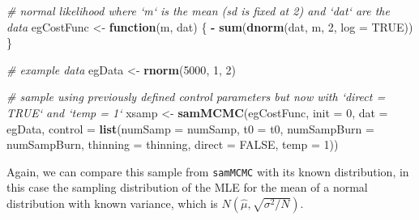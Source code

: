 \documentclass[]{article}
\newenvironment{Shaded}{\begin{snugshade}}{\end{snugshade}}
\newcommand{\CommentTok}[1]{\textcolor[rgb]{0.56,0.35,0.01}{\textit{#1}}}
\newcommand{\ControlFlowTok}[1]{\textcolor[rgb]{0.13,0.29,0.53}{\textbf{#1}}}
\newcommand{\DataTypeTok}[1]{\textcolor[rgb]{0.13,0.29,0.53}{#1}}
\newcommand{\DecValTok}[1]{\textcolor[rgb]{0.00,0.00,0.81}{#1}}
\newcommand{\KeywordTok}[1]{\textcolor[rgb]{0.13,0.29,0.53}{\textbf{#1}}}
\newcommand{\NormalTok}[1]{#1}
\newcommand{\OperatorTok}[1]{\textcolor[rgb]{0.81,0.36,0.00}{\textbf{#1}}}
\newcommand{\OtherTok}[1]{\textcolor[rgb]{0.56,0.35,0.01}{#1}}
\newcommand{\StringTok}[1]{\textcolor[rgb]{0.31,0.60,0.02}{#1}}
\begin{document}
\begin{Shaded}
\begin{Highlighting}[]
\CommentTok{# normal likelihood where `m` is the mean (sd is fixed at 2) and `dat` are the data}
\NormalTok{egCostFunc <-}\StringTok{ }\ControlFlowTok{function}\NormalTok{(m, dat) \{}
    \OperatorTok{-}\StringTok{ }\KeywordTok{sum}\NormalTok{(}\KeywordTok{dnorm}\NormalTok{(dat, m, }\DecValTok{2}\NormalTok{, }\DataTypeTok{log =} \OtherTok{TRUE}\NormalTok{))}
\NormalTok{\}}

\CommentTok{# example data}
\NormalTok{egData <-}\StringTok{ }\KeywordTok{rnorm}\NormalTok{(}\DecValTok{5000}\NormalTok{, }\DecValTok{1}\NormalTok{, }\DecValTok{2}\NormalTok{)}

\CommentTok{# sample using previously defined control parameters but now with `direct = TRUE` and `temp = 1`}
\NormalTok{xsamp <-}\StringTok{ }\KeywordTok{samMCMC}\NormalTok{(egCostFunc, }\DataTypeTok{init =} \DecValTok{0}\NormalTok{, }\DataTypeTok{dat =}\NormalTok{ egData, }
               \DataTypeTok{control =} \KeywordTok{list}\NormalTok{(}\DataTypeTok{numSamp =}\NormalTok{ numSamp, }\DataTypeTok{t0 =}\NormalTok{ t0, }\DataTypeTok{numSampBurn =}\NormalTok{ numSampBurn,}
                              \DataTypeTok{thinning =}\NormalTok{ thinning, }\DataTypeTok{direct =} \OtherTok{FALSE}\NormalTok{, }\DataTypeTok{temp =} \DecValTok{1}\NormalTok{))}
\end{Highlighting}
\end{Shaded}

Again, we can compare this sample from \texttt{samMCMC} with its known
distribution, in this case the sampling distribution of the MLE for the
mean of a normal distribution with known variance, which is
\(N(\hat{\mu}, \sqrt{\sigma^2 / N})\).

\begin{Shaded}
\end{Shaded}
\end{document}
